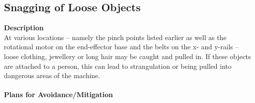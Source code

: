 \documentclass[titlepage]{article}
\begin{document}
\subsection{Snagging of Loose Objects}
\textbf{Description}\\
At various locations -- namely the pinch points listed earlier as well as the rotational motor on the end-effector base and the belts on the x- and y-rails -- loose clothing, jewellery or long hair may be caught and pulled in. If these objects are attached to a person, this can lead to strangulation or being pulled into dangerous areas of the machine.\\~\\
\textbf{Plans for Avoidance/Mitigation}\\
\end{document}
